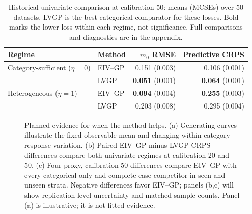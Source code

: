 \begin{table}[!htbp]
\centering\small
\caption{Historical univariate comparison at calibration 50: means (MCSEs) over 50 datasets. LVGP is the best categorical comparator for these losses. Bold marks the lower loss within each regime, not significance. Full comparisons and diagnostics are in the appendix.}
\label{tab:numerical-boundary}
\begin{tabular}{llrr}
\toprule
Regime & Method & $m_0$ RMSE & Predictive CRPS\\
\midrule
Category-sufficient ($\eta=0$) & EIV--GP & 0.151 (0.003) & 0.106 (0.001)\\
 & LVGP & \textbf{0.051} (0.001) & \textbf{0.064} (0.001)\\
Heterogeneous ($\eta=1$) & EIV--GP & \textbf{0.094} (0.004) & \textbf{0.255} (0.003)\\
 & LVGP & 0.203 (0.008) & 0.295 (0.004)\\
\bottomrule
\end{tabular}
\end{table}

\begin{figure}[!htbp]
\centering\small
{}\hfill
{}\hfill
{}
\caption{Planned evidence for when the method helps. (a) Generating curves illustrate the fixed observable mean and changing within-category response variation. (b) Paired EIV--GP-minus-LVGP CRPS differences compare both univariate regimes at calibration 20 and 50. (c) Four-proxy, calibration-50 differences compare EIV--GP with every categorical-only and complete-case competitor in seen and unseen strata. Negative differences favor EIV--GP; panels (b,c) will show replication-level uncertainty and matched sample counts. Panel (a) is illustrative; it is not fitted evidence.}
\label{fig:numerical-when}
\end{figure}

